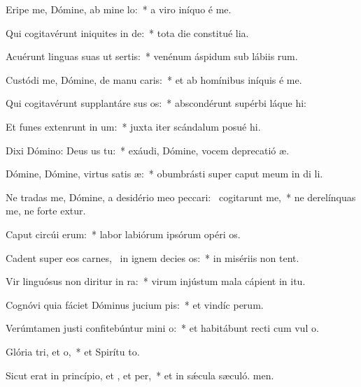 \item Eripe me, Dómine, ab mine lo:~* a viro iníquo é me.
\item Qui cogitavérunt iniquites in de:~* tota die constitué lia.
\item Acuérunt linguas suas ut sertis:~* venénum áspidum sub lábiis rum.
\item Custódi me, Dómine, de manu caris:~* et ab homínibus iníquis é me.
\item Qui cogitavérunt supplantáre sus os:~* abscondérunt supérbi láque hi:
\item Et funes extenrunt in um:~* juxta iter scándalum posué hi.
\item Dixi Dómino: Deus us  tu:~* exáudi, Dómine, vocem deprecatió æ.
\item Dómine, Dómine, virtus satis æ:~* obumbrásti super caput meum in di li.
\item Ne tradas me, Dómine, a desidério meo peccari:~\pscross{} cogitarunt  me,~* ne derelínquas me, ne forte extur.
\item Caput circúi erum:~* labor labiórum ipsórum opéri os.
\item Cadent super eos carnes,~\pscross{} in ignem decies os:~* in misériis non tent.
\item Vir linguósus non diritur in ra:~* virum injústum mala cápient in itu.
\item Cognóvi quia fáciet Dóminus jucium pis:~* et vindíc perum.
\item Verúmtamen justi confitebúntur mini o:~* et habitábunt recti cum vul o.
\item Glória tri, et o,~* et Spirítu to.
\item Sicut erat in princípio, et , et per,~* et in sǽcula sæculó. men.
